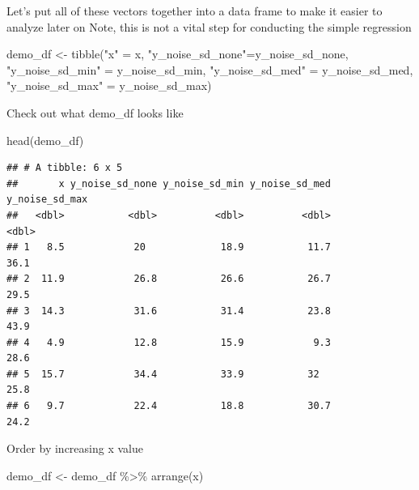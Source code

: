 \documentclass[
]{book}
\newenvironment{Shaded}{\begin{snugshade}}{\end{snugshade}}
\newcommand{\FunctionTok}[1]{\textcolor[rgb]{0.00,0.00,0.00}{#1}}
\newcommand{\NormalTok}[1]{#1}
\newcommand{\OtherTok}[1]{\textcolor[rgb]{0.56,0.35,0.01}{#1}}
\newcommand{\SpecialCharTok}[1]{\textcolor[rgb]{0.00,0.00,0.00}{#1}}
\newcommand{\StringTok}[1]{\textcolor[rgb]{0.31,0.60,0.02}{#1}}
\begin{document}
Let's put all of these vectors together into a data frame to make it easier to analyze later on
Note, this is not a vital step for conducting the simple regression

\begin{Shaded}
\begin{Highlighting}[]
\NormalTok{demo\_df }\OtherTok{\textless{}{-}} \FunctionTok{tibble}\NormalTok{(}\StringTok{"x"} \OtherTok{=}\NormalTok{ x, }
                  \StringTok{"y\_noise\_sd\_none"}\OtherTok{=}\NormalTok{y\_noise\_sd\_none, }
                  \StringTok{"y\_noise\_sd\_min"} \OtherTok{=}\NormalTok{ y\_noise\_sd\_min,}
                  \StringTok{"y\_noise\_sd\_med"} \OtherTok{=}\NormalTok{ y\_noise\_sd\_med,}
                  \StringTok{"y\_noise\_sd\_max"} \OtherTok{=}\NormalTok{ y\_noise\_sd\_max)}
\end{Highlighting}
\end{Shaded}

Check out what demo\_df looks like

\begin{Shaded}
\begin{Highlighting}[]
\FunctionTok{head}\NormalTok{(demo\_df)}
\end{Highlighting}
\end{Shaded}

\begin{verbatim}
## # A tibble: 6 x 5
##       x y_noise_sd_none y_noise_sd_min y_noise_sd_med y_noise_sd_max
##   <dbl>           <dbl>          <dbl>          <dbl>          <dbl>
## 1   8.5            20             18.9           11.7           36.1
## 2  11.9            26.8           26.6           26.7           29.5
## 3  14.3            31.6           31.4           23.8           43.9
## 4   4.9            12.8           15.9            9.3           28.6
## 5  15.7            34.4           33.9           32             25.8
## 6   9.7            22.4           18.8           30.7           24.2
\end{verbatim}

Order by increasing x value

\begin{Shaded}
\begin{Highlighting}[]
\NormalTok{demo\_df }\OtherTok{\textless{}{-}}\NormalTok{ demo\_df }\SpecialCharTok{\%\textgreater{}\%} 
  \FunctionTok{arrange}\NormalTok{(x)}
\end{Highlighting}
\end{Shaded}
\end{document}

